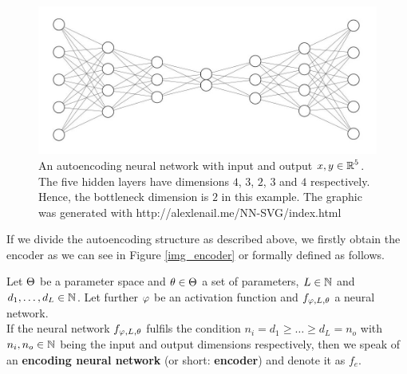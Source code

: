 \begin{figure}
\begin{center}
   \begin{minipage}[b]{0.9\linewidth}
      \includegraphics[width=\linewidth]{autoencoder}
      \caption{An autoencoding neural network with input and output $x, y\in \operatorname{\mathbb{R}}^5$. The five hidden layers have dimensions $4$, $3$, $2$, $3$ and $4$ respectively. Hence, the bottleneck dimension is $2$ in this example. The graphic was generated with http://alexlenail.me/NN-SVG/index.html}\label{fig:autoencoder}
	\end{minipage}
\end{center}
\end{figure}


If we divide the autoencoding structure as described above, we firstly obtain the encoder as we can see in Figure \ref{img_encoder} or formally defined as follows.

\begin{definition}\label{def_encoder}
Let $\operatorname{\Theta}$ be a parameter space and $\theta \in \operatorname{\Theta}$ a set of parameters, $L\in \operatorname{\mathbb{N}}$ and $d_1,\ldots, d_L\in\operatorname{\mathbb{N}}$. Let further $\operatorname{\varphi}$ be an activation function and $f_{\operatorname{\varphi},L,\theta}$ a neural network.\\
If the neural network $f_{\operatorname{\varphi},L,\theta}$ fulfils the condition $n_i= d_1 \geq \ldots \geq d_L = n_o$ with $n_i, n_o \in \operatorname{\mathbb{N}}$ being the input and output dimensions respectively, then we speak of an \textbf{encoding neural network} (or short: \textbf{encoder}) and denote it as $f_e$.
\end{definition}


